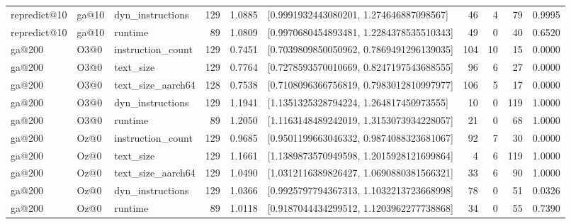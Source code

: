 \begin{table}[t]
\begin{tabular}{lllrrlrrrr}
repredict@10 & ga@10 & dyn\_instructions & 129 & 1.0885 & [0.9991932443080201, 1.274646887098567] & 46 & 4 & 79 & 0.9995 \\
repredict@10 & ga@10 & runtime & 89 & 1.0809 & [0.9970680454893481, 1.2284378535510343] & 49 & 0 & 40 & 0.6520 \\
ga@200 & O3@0 & instruction\_count & 129 & 0.7451 & [0.7039809850050962, 0.7869491296139035] & 104 & 10 & 15 & 0.0000 \\
ga@200 & O3@0 & text\_size & 129 & 0.7764 & [0.7278593570010669, 0.8247197543688555] & 96 & 6 & 27 & 0.0000 \\
ga@200 & O3@0 & text\_size\_aarch64 & 128 & 0.7538 & [0.7108096366756819, 0.7983012810997977] & 106 & 5 & 17 & 0.0000 \\
ga@200 & O3@0 & dyn\_instructions & 129 & 1.1941 & [1.1351325328794224, 1.264817450973555] & 10 & 0 & 119 & 1.0000 \\
ga@200 & O3@0 & runtime & 89 & 1.2050 & [1.1163148489242019, 1.3153073934228057] & 21 & 0 & 68 & 1.0000 \\
ga@200 & Oz@0 & instruction\_count & 129 & 0.9685 & [0.9501199663046332, 0.9874088323681067] & 92 & 7 & 30 & 0.0000 \\
ga@200 & Oz@0 & text\_size & 129 & 1.1661 & [1.1389873570949598, 1.2015928121699864] & 4 & 6 & 119 & 1.0000 \\
ga@200 & Oz@0 & text\_size\_aarch64 & 129 & 1.0490 & [1.0312116389826427, 1.0690880381566321] & 33 & 6 & 90 & 1.0000 \\
ga@200 & Oz@0 & dyn\_instructions & 129 & 1.0366 & [0.9925797794367313, 1.1032213723668998] & 78 & 0 & 51 & 0.0326 \\
ga@200 & Oz@0 & runtime & 89 & 1.0118 & [0.9187044434299512, 1.1203962277738868] & 34 & 0 & 55 & 0.7390 \\
\bottomrule
\end{tabular}
\end{table}
